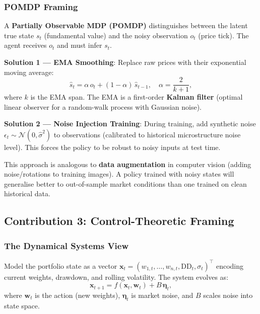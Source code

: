\documentclass[12pt,a4paper]{article}
\begin{document}
\subsubsection*{POMDP Framing}

A \textbf{Partially Observable MDP (POMDP)} distinguishes between the
latent true state $s_t$ (fundamental value) and the noisy observation
$o_t$ (price tick).  The agent receives $o_t$ and must infer $s_t$.

\textbf{Solution 1 --- EMA Smoothing}:
Replace raw prices with their exponential moving average:
\begin{equation}
  \hat{s}_t = \alpha\, o_t + (1-\alpha)\, \hat{s}_{t-1},
  \quad \alpha = \frac{2}{k+1},
  \label{eq:ema}
\end{equation}
where $k$ is the EMA span.  The EMA is a first-order \textbf{Kalman filter}
(optimal linear observer for a random-walk process with Gaussian noise).

\textbf{Solution 2 --- Noise Injection Training}:
During training, add synthetic noise $\epsilon_t \sim \mathcal{N}(0, \hat{\sigma}^2)$
to observations (calibrated to historical microstructure noise level).
This forces the policy to be robust to noisy inputs at test time.

\begin{finbox}
This approach is analogous to \textbf{data augmentation} in computer vision
(adding noise/rotations to training images).  A policy trained with noisy
states will generalise better to out-of-sample market conditions than one
trained on clean historical data.
\end{finbox}

\subsection{Contribution 3: Control-Theoretic Framing}

\subsubsection*{The Dynamical Systems View}

Model the portfolio state as a vector
$\mathbf{x}_t = (w_{1,t}, \ldots, w_{n,t}, \text{DD}_t, \sigma_t)^\top$
encoding current weights, drawdown, and rolling volatility.  The system
evolves as:
\begin{equation}
  \mathbf{x}_{t+1} = f(\mathbf{x}_t, \mathbf{w}_t) + B\, \boldsymbol{\eta}_t,
  \label{eq:dynamics}
\end{equation}
where $\mathbf{w}_t$ is the action (new weights), $\boldsymbol{\eta}_t$
is market noise, and $B$ scales noise into state space.
\end{document}
